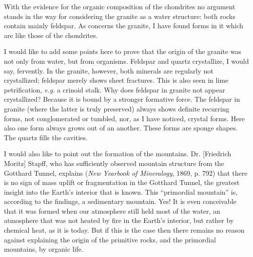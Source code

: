 \documentclass[a4paper, 12pt, oneside]{article}
\begin{document}
With the evidence for the organic composition of the chondrites no argument stands in the way for considering the granite as a water structure: both rocks contain mainly feldspar. As concerns the granite, I have found forms in it which are like those of the chondrites.

I would like to add some points here to prove that the origin of the granite was not only from water, but from organisms. Feldspar and quartz crystallize, I would say, fervently. In the granite, however, both minerals are regularly not crystallized; feldspar merely shows sheet fractures. This is also seen in lime petrification, \emph{e.g.} a crinoid stalk. Why does feldspar in granite not appear crystallized? Because it is bound by a stronger formative force. The feldspar in granite (where the latter is truly preserved) always shows definite recurring forms, not conglomerated or tumbled, nor, as I have noticed, crystal forms. Here also one form always grows out of an another. These forms are sponge shapes. The quartz fills the cavities.

I would also like to point out the formation of the mountains. Dr. [Friedrich Moritz] Stapff, who has sufficiently observed mountain structure from the Gotthard Tunnel, explains (\emph{New Yearbook of Mineralogy}, 1869, p. 792) that there is no sign of mass uplift or fragmentation in the Gotthard Tunnel, the greatest insight into the Earth's interior that is known. This ``primordial mountain'' is, according to the findings, a sedimentary mountain. Yes! It is even conceivable that it was formed when our atmosphere still held most of the water, an atmosphere that was not heated by fire in the Earth's interior, but rather by chemical heat, as it is today. But if this is the case then there remains no reason against explaining the origin of the primitive rocks, and the primordial mountains, by organic life.
\end{document}

